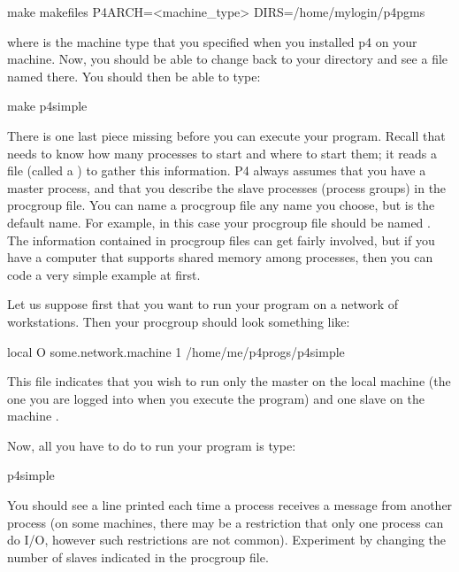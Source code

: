 \begin{example}
make makefiles P4ARCH=<machine_type> DIRS=/home/mylogin/p4pgms
\end{example}
\noindent
where  is the machine type that you specified when
you installed p4 on your machine.  Now, you should be able to change
back to your directory and see a file named  there.  
You should then be able to type:

\begin{example}
    make p4simple
\end{example}

There is one last piece missing before you can execute your program.  Recall
that  needs to know how many processes to start and
where to start them; it reads a file (called a ) to gather
this information.  P4 always assumes that you have a master process, and that
you describe the slave processes (process groups) in the procgroup file.  You
can name a procgroup file any name you choose, but  is the
default name.  For example, in this case your procgroup file should be named
.  The information contained in procgroup files can get
fairly involved, but if you have a computer that supports shared memory among
processes, then you can code a very simple example at first.

Let us suppose first that you want to run your program on a network of
workstations.  Then your procgroup should look something like:

\begin{example}
    local O
    some.network.machine 1 /home/me/p4progs/p4simple
\end{example}

This file indicates that you wish to run only the master on the local machine
(the one you are logged into when you execute the program) and one slave on
the machine .

Now, all you have to do to run your program is type:

\begin{example}
    p4simple
\end{example}

You should see a line printed each time a process receives a message
from another process (on some machines, there may be a restriction that
only one process can do I/O, however such restrictions are not
common).  Experiment by changing the number of slaves indicated in the
procgroup file.


